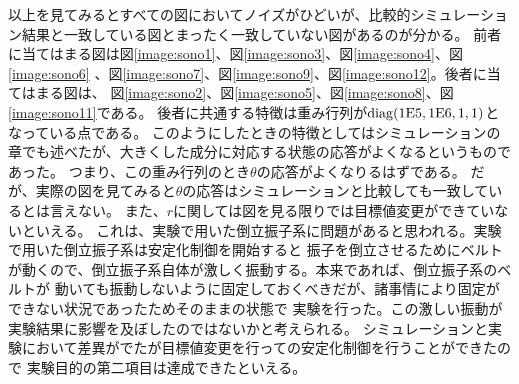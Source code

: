 	以上を見てみるとすべての図においてノイズがひどいが、比較的シミュレーション結果と一致している図とまったく一致していない図があるのが分かる。
	前者に当てはまる図は図\ref{image:sono1}、図\ref{image:sono3}、図\ref{image:sono4}、図\ref{image:sono6}
	、図\ref{image:sono7}、図\ref{image:sono9}、図\ref{image:sono12}。後者に当てはまる図は、
	図\ref{image:sono2}、図\ref{image:sono5}、図\ref{image:sono8}、図\ref{image:sono11}である。
	後者に共通する特徴は重み行列が$\rm{diag}(1E5,1E6,1,1)$となっている点である。
	このようにしたときの特徴としてはシミュレーションの章でも述べたが、大きくした成分に対応する状態の応答がよくなるというものであった。
	つまり、この重み行列のとき$\theta$の応答がよくなりるはずである。
	だが、実際の図を見てみると$\theta$の応答はシミュレーションと比較しても一致しているとは言えない。
	また、$r$に関しては図を見る限りでは目標値変更ができていないといえる。
	これは、実験で用いた倒立振子系に問題があると思われる。実験で用いた倒立振子系は安定化制御を開始すると
	振子を倒立させるためにベルトが動くので、倒立振子系自体が激しく振動する。本来であれば、倒立振子系のベルトが
	動いても振動しないように固定しておくべきだが、諸事情により固定ができない状況であったためそのままの状態で
	実験を行った。この激しい振動が実験結果に影響を及ぼしたのではないかと考えられる。
	シミュレーションと実験において差異がでたが目標値変更を行っての安定化制御を行うことができたので
	実験目的の第二項目は達成できたといえる。
	
	

